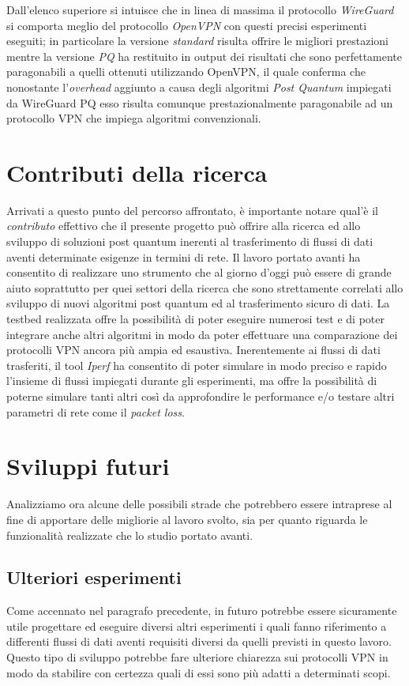 Dall'elenco superiore si intuisce che in linea di massima il protocollo \emph{WireGuard} si comporta meglio del protocollo \emph{OpenVPN} con questi precisi esperimenti eseguiti; in particolare la versione \emph{standard} risulta offrire le migliori prestazioni mentre la versione \emph{PQ} ha restituito in output dei risultati che sono perfettamente paragonabili a quelli ottenuti utilizzando OpenVPN, il quale conferma che nonostante l'\emph{overhead} aggiunto a causa degli algoritmi \emph{Post Quantum} impiegati da WireGuard PQ esso risulta comunque prestazionalmente paragonabile ad un protocollo VPN che impiega algoritmi convenzionali. 

\section{Contributi della ricerca}
Arrivati a questo punto del percorso affrontato, è importante notare qual'è il \emph{contributo} effettivo che il presente progetto può offrire alla ricerca ed allo sviluppo di soluzioni post quantum inerenti al trasferimento di flussi di dati aventi determinate esigenze in termini di rete. Il lavoro portato avanti ha consentito di realizzare uno strumento che al giorno d'oggi può essere di grande aiuto soprattutto per quei settori della ricerca che sono strettamente correlati allo sviluppo di nuovi algoritmi post quantum ed al trasferimento sicuro di dati. La testbed realizzata offre la possibilità di poter eseguire numerosi test e di poter integrare anche altri algoritmi in modo da poter effettuare una comparazione dei protocolli VPN ancora più ampia ed esaustiva. Inerentemente ai flussi di dati trasferiti, il tool \emph{Iperf} ha consentito di poter simulare in modo preciso e rapido l'insieme di flussi impiegati durante gli esperimenti, ma offre la possibilità di poterne simulare tanti altri così da approfondire le performance e/o testare altri parametri di rete come il \emph{packet loss}.
\section{Sviluppi futuri}
Analizziamo ora alcune delle possibili strade che potrebbero essere intraprese al fine di apportare delle migliorie al lavoro svolto, sia per quanto riguarda le funzionalità realizzate che lo studio portato avanti.

\subsection{Ulteriori esperimenti}
Come accennato nel paragrafo precedente, in futuro potrebbe essere sicuramente utile progettare ed eseguire diversi altri esperimenti i quali fanno riferimento a differenti flussi di dati aventi requisiti diversi da quelli previsti in questo lavoro. Questo tipo di sviluppo potrebbe fare ulteriore chiarezza sui protocolli VPN in modo da stabilire con certezza quali di essi sono più adatti a determinati scopi.

